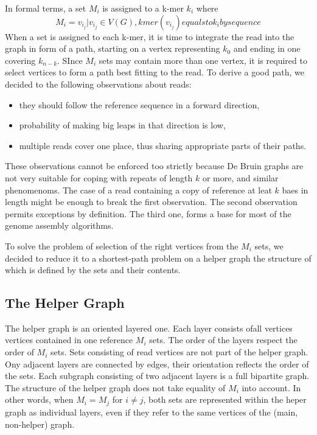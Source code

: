 In formal terms, a set $M_i$ is assigned to a k-mer $k_i$ where
$$
M_i = {v_{i_j} | v_{i_j} \in V(G), kmer(v_{i_j}) equals to k_i by sequence}
$$ 
When a set is assigned to each k-mer, it is time to integrate the read into the graph in form of a path, starting on a vertex representing $k_0$ and ending in one covering $k_{n-k}$. SInce $M_i$ sets may contain more than one vertex, it is required to select vertices to form a path best fitting to the read. To derive a good path, we decided to the following observations about reads:
\begin{itemize}
\item they should follow the reference sequence in a forward direction,
\item probability of making big leaps in that direction is low,
\item multiple reads cover one place, thus sharing appropriate parts of their paths.
\end{itemize}

These observations cannot be enforced too strictly because De Bruin graphs are not very suitable for coping with repeats of length $k$ or more, and similar phenomenoms. The case of a read containing a copy of reference at leat $k$ baes in length might be enough to break the first observation. The second observation permits exceptions by definition. The third one, forms a base for most of the genome assembly algorithms.

To solve the problem of selection of the right vertices from the $M_i$ sets, we decided to reduce it to a shortest-path problem on a helper graph the structure of which is defined by the sets and their contents.

\subsection{The Helper Graph}
\label{subsec:helper-graph}

The helper graph is an oriented layered one. Each layer consists ofall vertices  vertices contained in one reference $M_i$ sets. The order of the layers respect the order of $M_i$ sets. Sets consisting of read vertices are not part of the helper graph. Ony adjacent layers are connected by edges, their orientation reflects the order of the sets. Each subgraph consisting of two adjacent layers is a full bipartite graph. The structure of the helper graph does not take equality of $M_i$ into account. In other words, when $M_i = M_j$ for $i \ne j$, both sets are represented within the heper graph as individual layers, even if they refer to the same vertices of the (main, non-helper) graph.

